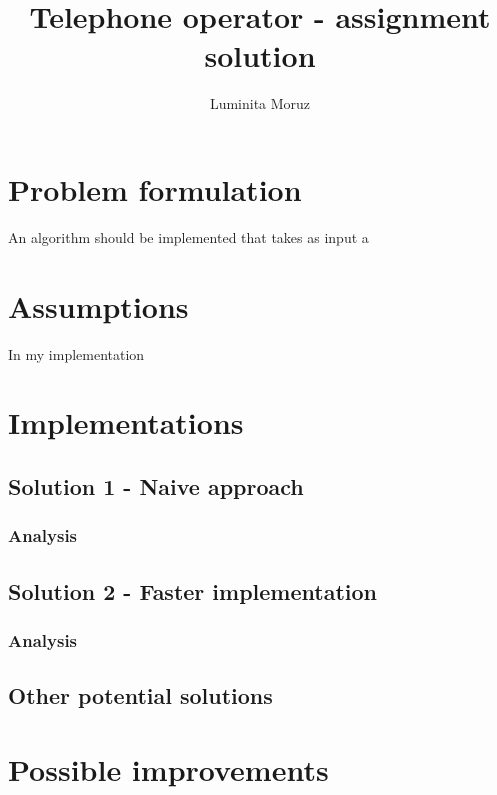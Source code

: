 \documentclass[12pt]{article}
\title{{\bf Telephone operator - assignment solution}}
\author{
Luminita Moruz  \\
}
\begin{document}
\maketitle

\section{Problem formulation}
\label{sec:problem}
An algorithm should be implemented that takes as input a 


\section{Assumptions}
In my implementation 

\section{Implementations}


\subsection{Solution 1 - Naive approach}

\subsubsection{Analysis}

\subsection{Solution 2 - Faster implementation}

\subsubsection{Analysis}

\subsection{Other potential solutions}

\section{Possible improvements}
\end{document}
